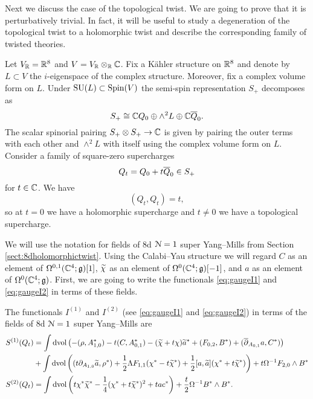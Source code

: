\documentclass[10pt, oneside]{article}
\begin{document}
Next we discuss the case of the topological twist. We are going to prove that it is perturbatively trivial. In fact, it will be useful to study a degeneration of the topological twist to a holomorphic twist and describe the corresponding family of twisted theories.

Let $V_\mathbb R = \mathbb R^8$ and $V=V_\mathbb R\otimes_\mathbb R\mathbb C$. Fix a K\"ahler structure on $\mathbb R^8$ and denote by $L\subset V$ the $i$-eigenspace of the complex structure. Moreover, fix a complex volume form on $L$. Under $\mathrm{SU}(L)\subset \mathrm{Spin}(V)$ the semi-spin representation $S_+$ decomposes as
\[S_+\cong \mathbb C Q_0\oplus \wedge^2 L\oplus \mathbb C \overline{Q}_0.\]
The scalar spinorial pairing $S_+\otimes S_+\rightarrow \mathbb C$ is given by pairing the outer terms with each other and $\wedge^2L$ with itself using the complex volume form on $L$. Consider a family of square-zero supercharges
\begin{equation}
Q_t = Q_0 + t\Bar{Q}_0\in S_+
\label{eq:8dHodgefamily}
\end{equation}
for $t\in\mathbb C$. We have
\[(Q_t, Q_t) = t,\]
so at $t=0$ we have a holomorphic supercharge and $t\neq 0$ we have a topological supercharge.

We will use the notation for fields of 8d $\mathcal N=1$ super Yang--Mills from Section \ref{sect:8dholomorphictwist}. Using the Calabi--Yau structure we will regard $C$ as an element of $\Omega^{0, 1}(\mathbb C^4;\mathfrak g)[1]$, $\widetilde{\chi}$ as an element of $\Omega^0(\mathbb C^4;\mathfrak g)[-1]$, and $a$ as an element of $\Omega^0(\mathbb C^4 ; \mathfrak g)$. First, we are going to write the functionals \eqref{eq:gaugeI1} and \eqref{eq:gaugeI2} in terms of these fields.

\begin{prop}
The functionals $I^{(1)}$ and $I^{(2)}$ (see \eqref{eq:gaugeI1} and \eqref{eq:gaugeI2}) in terms of the fields of 8d $\mathcal N=1$ super Yang--Mills are
\begin{align*}
S^{(1)}(Q_t) &= \int \operatorname{dvol}\left(-(\rho, A_{1, 0}^*) - t(C, A_{0, 1}^*) - (\widetilde{\chi} + t\chi)\widetilde{a}^* + (F_{0, 2}, B^*)  + (\overline{\partial}_{A_{0, 1}} a, C^*)\right) \\
&+ \int\operatorname{dvol}\left((t\partial_{A_{1, 0}} \widetilde{a}, \rho^*) + \frac{1}{2}\Lambda F_{1, 1}(\chi^* - t\widetilde{\chi}^*) + \frac{1}{2}[a, \widetilde{a}](\chi^*+t\widetilde{\chi}^*)\right) + t\Omega^{-1} F_{2, 0}\wedge B^* \\
S^{(2)}(Q_t) &= \int \operatorname{dvol} \left(t\chi^*\widetilde{\chi}^* -\frac{1}{4}(\chi^* + t\widetilde{\chi}^*)^2 + tac^*\right) + \frac{t}{2}\Omega^{-1}B^*\wedge B^* .
\end{align*}
\end{prop}
\end{document}
